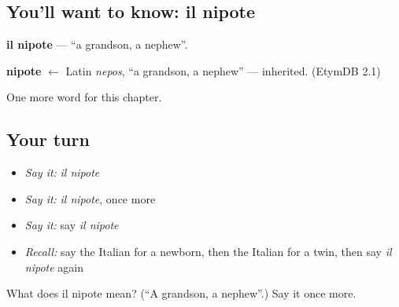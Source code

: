 \subsection*{You'll want to know: il nipote}
\textbf{il nipote} — \textquotedblleft{}a grandson, a nephew\textquotedblright{}.

\begin{cousinweb}
\textbf{nipote} $\leftarrow$ Latin \emph{nepos}, \textquotedblleft{}a grandson, a nephew\textquotedblright{} — inherited. (EtymDB 2.1)
\end{cousinweb}

\begin{grammarlens}[title={What you've built}]
One more word for this chapter.
\end{grammarlens}

\subsection*{Your turn}
\begin{itemize}
\raggedright
  \item \emph{Say it:} \emph{il nipote}
  \item \emph{Say it:} \emph{il nipote}, once more
  \item \emph{Say it:} say \emph{il nipote}
  \item \emph{Recall:} say the Italian for a newborn, then the Italian for a twin, then say \emph{il nipote} again
\end{itemize}

\begin{tcolorbox}[breakable,colback=teal!4,colframe=teal!35!black,title={Before you move on}]
What does il nipote mean? (\textquotedblleft{}A grandson, a nephew\textquotedblright{}.) Say it once more.
\end{tcolorbox}
